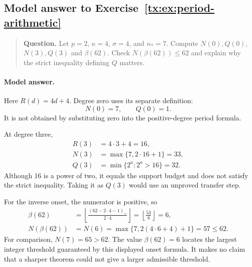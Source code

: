 \begin{samepage}

\subsection*{Model answer to Exercise~\ref{tx:ex:period-arithmetic}}\label{tx:ans:period-arithmetic}

\begin{quote}\small\textbf{Question.} Let $p=2$, $\kappa=4$, $\sigma=4$, and $n_*=7$. Compute $N(0),Q(0)$,
$N(3),Q(3)$ and $\beta(62)$. Check $N(\beta(62))\le62$ and explain
why the strict inequality defining $Q$ matters.
\end{quote}

\paragraph{Model answer.}
Here \(R(d)=4d+4\). Degree zero uses its separate definition:
\[
                            N(0)=7,\qquad Q(0)=1.
\]
It is not obtained by substituting zero into the positive-degree
period formula.
\end{samepage}

At degree three,
\[
 \begin{aligned}
 R(3)&=4\cdot3+4=16,\\
 N(3)&=\max\{7,2\cdot16+1\}=33,\\
 Q(3)&=\min\{2^a:2^a>16\}=32.
 \end{aligned}
\]
Although \(16\) is a power of two, it equals the support budget and
does not satisfy the strict inequality. Taking it as \(Q(3)\)
would use an unproved transfer step.

For the inverse onset, the numerator is positive, so
\[
 \begin{aligned}
 \beta(62)
   &=\left\lfloor\frac{(62-2\cdot4-1)_+}{2\cdot4}\right\rfloor
     =\left\lfloor\frac{53}{8}\right\rfloor=6,\\
 N(\beta(62))
   &=N(6)=\max\{7,2(4\cdot6+4)+1\}=57\le62.
 \end{aligned}
\]
For comparison, \(N(7)=65>62\). The value \(\beta(62)=6\)
locates the largest integer threshold guaranteed by this displayed
onset formula. It makes no claim that a sharper theorem could not
give a larger admissible threshold.


\par


